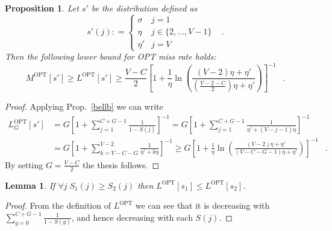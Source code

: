 \documentclass[11pt,a4paper]{article}
\DeclareMathOperator{\opt}{OPT}
\DeclareMathOperator{\mf}{\enspace .}
\newcommand{\deq}{\mathrel{\mathop:}=}
\newtheorem{proposition}{Proposition}
\newtheorem{lemma}{Lemma}
\theoremstyle{definition}
\theoremstyle{remark}
\begin{document}
\begin{proposition}\label{prop:quasi-uniform-lopt}
  Let $s'$ be the distribution defined as
  \begin{equation}
    s'(j) \deq
    \begin{cases}
      \sigma & j=1\\
      \eta & j\in \{2,\ldots,V-1\}\\
      \eta' & j=V 
    \end{cases}\mf
  \end{equation}
  Then the following lower bound for OPT miss rate holds:
  \begin{equation}
    M^{\opt}[s'] \geq  L^{\opt}[s'] \geq \frac{V-C}{2}\left[ 1+\frac{1}{\eta} 
      \ln\left( \frac{(V-2)\eta+\eta'}{\left(\frac{V-2-C}{2}\right)\eta + \eta'}
      \right) \right]^{-1} \mf
  \end{equation}
\end{proposition}
\begin{proof}
  Applying Prop.~\ref{bellb} we can write
  \begin{align}
    L^{\opt}_G[s']&=G\left[1+\sum_{j=1}^{C+G-1} \frac{1}{1-S(j)}\right]^{-1}
    = G\left[1+\sum_{j=1}^{C+G-1} \frac{1}{\eta'+(V-j-1)\eta}\right]^{-1} \\
    &= G\left[1+\sum_{k=V-C-G}^{V-2} \frac{1}{\eta'+k\eta}\right]^{-1}
    \geq G\left[1 + \frac{1}{\eta} \ln \left(
        \frac{(V-2)\eta+\eta'}{(V-C-G-1)\eta + \eta'} \right) \right]^{-1} \mf
  \end{align}
  By setting $G=\frac{V-C}{2}$ the thesis follows.
\end{proof}

\begin{lemma}\label{belb}
  If $\forall j \; S_1(j) \geq S_2(j)$ then $L^{\opt}[s_1] \leq L^{\opt}[s_2]$.
\end{lemma}
\begin{proof}  From the definition of $L^{\opt}$ we can see that it is decreasing with
  $\sum_{g=0}^{C+G-1} \frac{1}{1-S(g)}$, and hence decreasing with each $S(j)$.
\end{proof}
\end{document}
